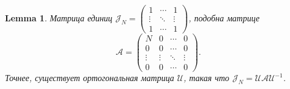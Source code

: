 \documentclass[a4paper]{article}
\newtheorem{lem}{Lemma}
\theoremstyle{definition}
\begin{document}
\begin{lem}
    Матрица единиц 
    \( \mathcal{J}_N =
    \begin{pmatrix}
        1 & \cdots & 1 \\
        \vdots & \ddots & \vdots \\ 
    1 & \cdots & 1 \end{pmatrix} \),
    подобна матрице
    \[
        \mathcal{A} = \begin{pmatrix}
            N & 0 & \cdots & 0 \\
            0 & 0 & \cdots & 0 \\
            \vdots & \vdots & \ddots & \vdots \\
            0 & 0 & \cdots & 0 \end{pmatrix}. \]
    Точнее, существует ортогональная матрица \( \mathcal{U} \),
    такая что
    \( \mathcal{J}_N = \mathcal{U}\mathcal{A} \mathcal{U}^{-1} \).
\end{lem}
\end{document}
